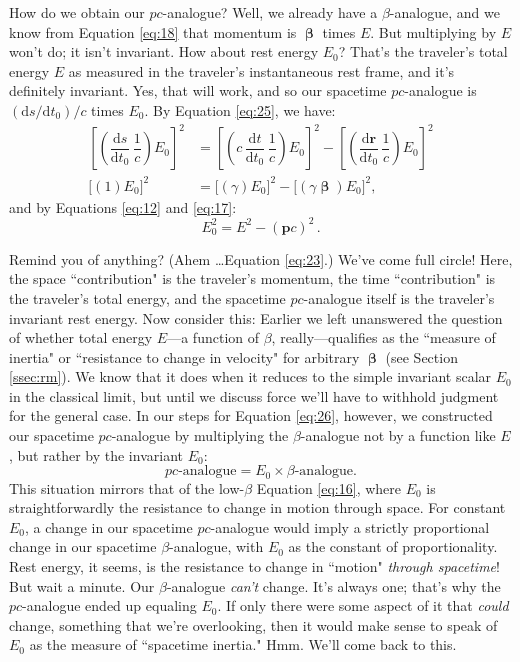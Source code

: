 \documentclass[12pt]{article}
\renewcommand{\vv}[1]{\mathbf{#1}}
\newcommand{\dd}[1]{\mathrm{d}#1}
\newcommand{\vvbeta}{\bm{\upbeta}}
\begin{document}
How do we obtain our $p c$-analogue? Well, we already have a $\beta$-analogue, and we know from Equation \ref{eq:18} that momentum is $\vvbeta$ times $E$. But multiplying by $E$ won't do; it isn't invariant. How about rest energy $E_0$? That's the traveler's total energy $E$ as measured in the traveler's instantaneous rest frame, and it's definitely invariant. Yes, that will work, and so our spacetime $p c$-analogue is $(\dd s/\dd t_0)/c$ times $E_0$. By Equation \ref{eq:25}, we have:
\begin{equation*}
\begin{split}
\left[ \left(\dfrac{\dd s}{\dd t_0} \, \dfrac{1}{c} \right) E_0 \right]^2 &= \left[ \left(c \, \dfrac{\dd t}{\dd t_0} \, \dfrac{1}{c}\right) E_0\right]^2 - \left[ \left(\dfrac{\dd \vv r}{\dd t_0} \, \dfrac{1}{c} \right)E_0\right]^2 \\[5pt]
\bigl[ (1)E_0 \bigr]^2 &=  \bigl[ (\gamma) E_0 \bigr] ^2 - \bigl[ (\gamma \bm{\upbeta}) E_0 \bigr] ^2 ,
\end{split}
\end{equation*}
and by Equations \ref{eq:12} and \ref{eq:17}:
\begin{equation}\label{eq:26}
\boxed{E_0^2 = E^2 - (\vv p c)^2} \, .
\end{equation}

Remind you of anything? (Ahem \dots Equation \ref{eq:23}.) We've come full circle! Here, the space ``contribution" is the traveler's momentum, the time ``contribution" is the traveler's total energy, and the spacetime $p c$-analogue itself is the traveler's invariant rest energy. Now consider this: Earlier we left unanswered the question of whether total energy $E$---a function of $\beta$, really---qualifies as the ``measure of inertia" or ``resistance to change in velocity" for arbitrary $\vvbeta$ (see Section \ref{ssec:rm}). We know that it does when it reduces to the simple invariant scalar $E_0$ in the classical limit, but until we discuss force we'll have to withhold judgment for the general case. In our steps for Equation \ref{eq:26}, however, we constructed our spacetime $p c$-analogue by multiplying the $\beta$-analogue not by a function like $E$, but rather by the invariant $E_0$:
\begin{equation*}
p c \textrm{-analogue} = E_0 \times \beta \textrm{-analogue}.
\end{equation*}
This situation mirrors that of the low-$\beta$ Equation \ref{eq:16}, where $E_0$ is straightforwardly the resistance to change in motion through space. For constant $E_0$, a change in our spacetime $p c$-analogue would imply a strictly proportional change in our spacetime $\beta$-analogue, with $E_0$ as the constant of proportionality. Rest energy, it seems, is the resistance to change in ``motion" \emph{through spacetime}! But wait a minute. Our $\beta$-analogue \emph{can't} change. It's always one; that's why the $p c$-analogue ended up equaling $E_0$. If only there were some aspect of it that \emph{could} change, something that we're overlooking, then it would make sense to speak of $E_0$ as the measure of ``spacetime inertia." Hmm. We'll come back to this.
\end{document}
